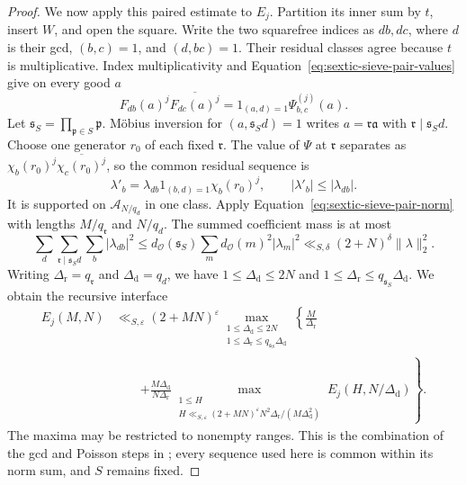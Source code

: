 \documentclass[11pt,a4paper]{article}
\numberwithin{equation}{section}
\numberwithin{figure}{section}
\theoremstyle{definition}
\theoremstyle{remark}
\begin{document}
\begin{proof}
We now apply this paired estimate to $E_j$.  Partition its inner sum by
$t$, insert $W$, and open the square.  Write the two squarefree indices as
$db,dc$, where $d$ is their gcd, $(b,c)=1$, and $(d,bc)=1$.  Their residual
classes agree because $t$ is multiplicative.  Index multiplicativity and
Equation~\eqref{eq:sextic-sieve-pair-values} give on every good $a$
\[
 F_{db}(a)^j\overline{F_{dc}(a)^j}
   =1_{(a,d)=1}\Psi_{b,c}^{(j)}(a).
\]
Let $\mathfrak s_S=\prod_{\mathfrak p\in S}\mathfrak p$.  M\"obius inversion
for $(a,\mathfrak s_Sd)=1$ writes $a=\mathfrak r\mathfrak a$ with
$\mathfrak r\mid\mathfrak s_Sd$.  Choose one generator $r_0$ of each
fixed $\mathfrak r$.  The value of $\Psi$ at $\mathfrak r$ separates as
$\chi_b(r_0)^j\overline{\chi_c(r_0)^j}$, so the common residual sequence is
\[
 \lambda'_b=\lambda_{db}1_{(b,d)=1}\chi_b(r_0)^j,
 \qquad |\lambda'_b|\le|\lambda_{db}|.
\]
It is supported on $\mathcal A_{N/q_d}$ in one class.  Apply
Equation~\eqref{eq:sextic-sieve-pair-norm} with lengths $M/q_{\mathfrak r}$
and $N/q_d$.  The summed coefficient mass is at most
\[
 \sum_d\sum_{\mathfrak r\mid\mathfrak s_Sd}\sum_b|\lambda_{db}|^2
 \le d_{\mathcal O}(\mathfrak s_S)
       \sum_m d_{\mathcal O}(m)^2|\lambda_m|^2
 \ll_{S,\delta}(2+N)^\delta\|\lambda\|_2^2.
\]
Writing $\Delta_{\mathrm r}=q_{\mathfrak r}$ and $\Delta_{\mathrm d}=q_d$, we have
$1\le\Delta_{\mathrm d}\le2N$ and $1\le\Delta_{\mathrm r}\le q_{\mathfrak s_S}\Delta_{\mathrm d}$.
We obtain the recursive interface
\begin{equation}\label{eq:sextic-sieve-norm-reflection}
 \begin{split}
 E_j(M,N)
 &\ll_{S,\varepsilon}(2+MN)^\varepsilon
 \max_{\substack{1\le\Delta_{\mathrm d}\le2N\\
                 1\le\Delta_{\mathrm r}\le q_{\mathfrak s_S}\Delta_{\mathrm d}}}
 \left\{\frac M{\Delta_{\mathrm r}}\right.\\
 &\qquad\left.+
 \frac{M\Delta_{\mathrm d}}{N\Delta_{\mathrm r}}
 \max_{\substack{1\le H\\
       H\ll_{S,\varepsilon}(2+MN)^\varepsilon
              N^2\Delta_{\mathrm r}/(M\Delta_{\mathrm d}^2)}}
       E_j(H,N/\Delta_{\mathrm d})\right\}.
 \end{split}
\end{equation}
The maxima may be restricted to nonempty ranges.  This is the combination
of the gcd and Poisson steps in \cite[Lemmas~3.2--3.3]{BGL}; every sequence
used here is common within its norm sum, and $S$ remains fixed.


\end{proof}
\end{document}
